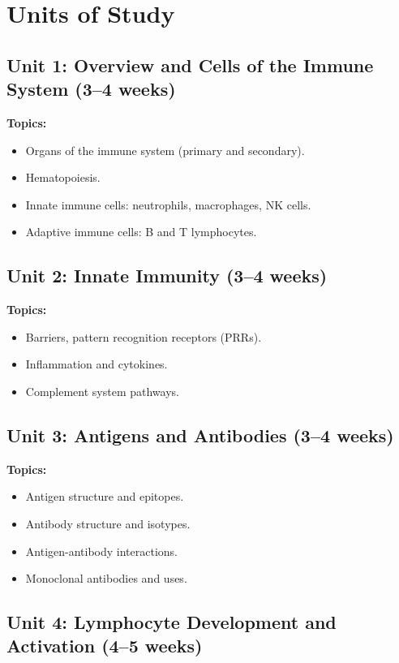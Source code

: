 \documentclass[12pt,oneside]{book}
\begin{document}
\section{Units of Study}

\subsection{Unit 1: Overview and Cells of the Immune System (3--4 weeks)}

\textbf{Topics:}
\begin{itemize}
    \item Organs of the immune system (primary and secondary).
    \item Hematopoiesis.
    \item Innate immune cells: neutrophils, macrophages, NK cells.
    \item Adaptive immune cells: B and T lymphocytes.
\end{itemize}

\subsection{Unit 2: Innate Immunity (3--4 weeks)}

\textbf{Topics:}
\begin{itemize}
    \item Barriers, pattern recognition receptors (PRRs).
    \item Inflammation and cytokines.
    \item Complement system pathways.
\end{itemize}

\subsection{Unit 3: Antigens and Antibodies (3--4 weeks)}

\textbf{Topics:}
\begin{itemize}
    \item Antigen structure and epitopes.
    \item Antibody structure and isotypes.
    \item Antigen-antibody interactions.
    \item Monoclonal antibodies and uses.
\end{itemize}

\subsection{Unit 4: Lymphocyte Development and Activation (4--5 weeks)}
\end{document}
